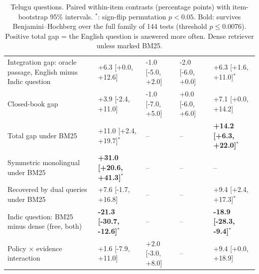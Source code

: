 \begin{table}[t]
\begin{tabular}{@{}p{5.2cm}llll@{}}
Integration gap: oracle passage, English minus Indic question & +6.3 [+0.0, +12.6] & -1.0 [-5.0, +2.0] & -2.0 [-6.0, +0.0] & +6.3 [+1.6, +11.0]$^{*}$ \\
Closed-book gap & +3.9 [-2.4, +11.0] & -1.0 [-7.0, +5.0] & +0.0 [-6.0, +6.0] & +7.1 [+0.0, +14.2] \\
Total gap under BM25 & +11.0 [+2.4, +19.7]$^{*}$ & -- & -- & \textbf{+14.2 [+6.3, +22.0]$^{*}$} \\
Symmetric monolingual under BM25 & \textbf{+31.0 [+20.6, +41.3]$^{*}$} & -- & -- & -- \\
Recovered by dual queries under BM25 & +7.6 [-1.7, +16.8] & -- & -- & +9.4 [+2.4, +17.3]$^{*}$ \\
Indic question: BM25 minus dense (free, both) & \textbf{-21.3 [-30.7, -12.6]$^{*}$} & -- & -- & \textbf{-18.9 [-28.3, -9.4]$^{*}$} \\
\midrule
Policy $\times$ evidence interaction & +1.6 [-7.9, +11.0] & +2.0 [-3.0, +8.0] & -- & +9.4 [+0.0, +18.9] \\
\bottomrule
\end{tabular}
\caption{Telugu questions. Paired within-item contrasts (percentage points) with item-bootstrap 95\% intervals. $^{*}$: sign-flip permutation $p<0.05$. Bold: survives Benjamini--Hochberg over the full family of 144 tests (threshold $p \le 0.0076$). Positive total gap = the English question is answered more often. Dense retriever unless marked BM25.}
\label{tab:fullcontrasts_te}
\end{table}

